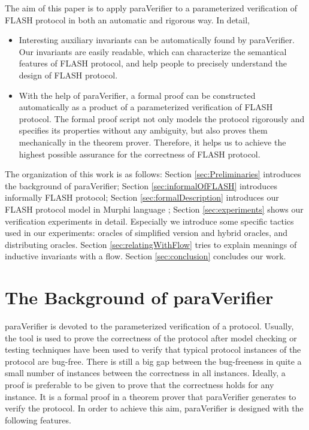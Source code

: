 \documentclass{llncs}
\newcommand{\bedt}[1]{{\color{blue}#1}}
\begin{document}
The aim of this paper is to apply {\sf paraVerifier} \cite{liatva2015} to a  parameterized verification of FLASH protocol in both an automatic and rigorous way. In detail,
\begin{itemize}
\item Interesting auxiliary invariants can be  automatically found by {\sf paraVerifier}. Our invariants are \bedt{easily readable}, which can characterize the semantical features of FLASH protocol, and help people to precisely understand the design of   FLASH protocol.

\item With the help of {\sf paraVerifier}, a formal proof can be constructed automatically as a product of a parameterized verification of FLASH protocol. The formal proof script not  only models the protocol rigorously and specifies its properties without any ambiguity, but also proves them mechanically in the theorem prover. Therefore, it helps us to achieve the highest possible assurance for the correctness of FLASH protocol.


\end{itemize}

The organization of this work is as follows: Section \ref{sec:Preliminaries} introduces the background of {\sf paraVerifier}; Section  \ref{sec:informalOfFLASH} introduces informally FLASH protocol; Section \ref{sec:formalDescription} introduces our FLASH protocol model in Murphi \bedt{language} \cite{Dill1996}; Section \ref{sec:experiments} shows our verification experiments in detail. Especially we introduce some \bedt{specific tactics} used in our experiments: oracles of simplified version and hybrid oracles, and distributing oracles. Section \ref{sec:relatingWithFlow} tries to explain meanings of inductive invariants with a flow.  Section \ref{sec:conclusion} concludes our work.

\section{The Background  of {\sf paraVerifier}\label{sec:Preliminaries}}
{\sf paraVerifier} is devoted to the parameterized verification of a protocol. Usually, the tool is used to prove the correctness of the protocol after model checking or testing techniques have been used to verify that typical protocol instances of the protocol  are bug-free. There is still a big gap between the bug-freeness in quite a small number of instances between the correctness in all instances.  Ideally, a proof is preferable to be given to  prove that the correctness holds for any instance. It is a formal proof in a theorem prover that {\sf paraVerifier} generates to verify the protocol. In order to achieve this aim, {\sf paraVerifier} is designed with the following features.
\end{document}
